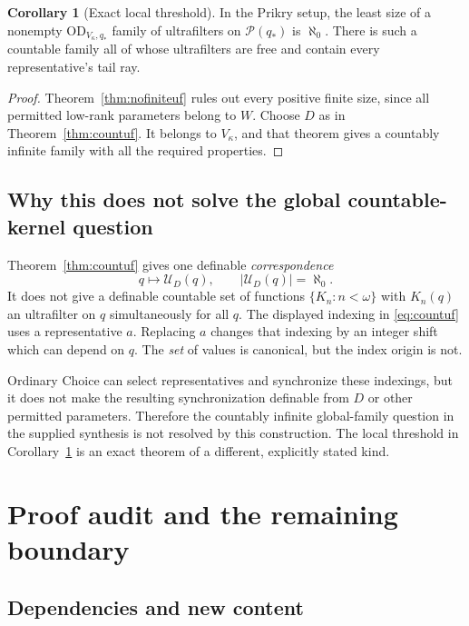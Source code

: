 \documentclass[11pt,letterpaper]{article}
\theoremstyle{definition}
\newtheorem{corollary}[definition]{Corollary}
\numberwithin{equation}{section}
\newcommand{\OD}{\mathrm{OD}}
\newcommand{\Pow}{\mathcal P}
\begin{document}
\begin{corollary}[Exact local threshold]\label{cor:threshold}
In the Prikry setup, the least size of a nonempty
$\OD_{V_\kappa,q_*}$ family of ultrafilters on $\Pow(q_*)$ is $\aleph_0$.
There is such a countable family all of whose ultrafilters are free and
contain every representative's tail ray.
\end{corollary}

\begin{proof}
Theorem~\ref{thm:nofiniteuf} rules out every positive finite size, since
all permitted low-rank parameters belong to $W$. Choose $D$ as in
Theorem~\ref{thm:countuf}. It belongs to $V_\kappa$, and that theorem gives
a countably infinite family with all the required properties.
\end{proof}

\subsection{Why this does not solve the global countable-kernel question}

Theorem~\ref{thm:countuf} gives one definable \emph{correspondence}
\[
       q\longmapsto\mathscr U_D(q),
              \qquad |\mathscr U_D(q)|=\aleph_0.
\]
It does not give a definable countable set of functions
$\{K_n:n<\omega\}$ with $K_n(q)$ an ultrafilter on $q$ simultaneously
for all $q$. The displayed indexing in \eqref{eq:countuf} uses a
representative $a$. Replacing $a$ changes that indexing by an integer
shift which can depend on $q$. The \emph{set} of values is canonical,
but the index origin is not.

Ordinary Choice can select representatives and synchronize these
indexings, but it does not make the resulting synchronization definable
from $D$ or other permitted parameters. Therefore the countably infinite
global-family question in the supplied synthesis is not resolved by
this construction. The local threshold in Corollary~\ref{cor:threshold}
is an exact theorem of a different, explicitly stated kind.

\section{Proof audit and the remaining boundary}\label{sec:audit}

\subsection{Dependencies and new content}
\end{document}
